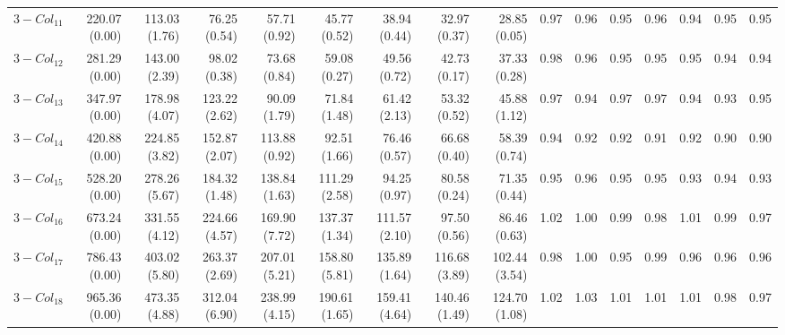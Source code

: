 \documentclass[preprint]{tlp}
\begin{document}
\begin{landscape}
\begin{tabular}{@{\extracolsep{\fill}}|c|r|r|r|r|r|r|r|r||r|r|r|r|r|r|r|}
$3-Col_{11}$ & 220.07 (0.00) &  113.03 (1.76) &  76.25 (0.54) &  57.71 (0.92) &  45.77 (0.52) &  38.94 (0.44) &  32.97 (0.37) &  28.85 (0.05) & 0.97 & 0.96 & 0.95 & 0.96 & 0.94 & 0.95 & 0.95 \\
$3-Col_{12}$ & 281.29 (0.00) &  143.00 (2.39) &  98.02 (0.38) &  73.68 (0.84) &  59.08 (0.27) &  49.56 (0.72) &  42.73 (0.17) &  37.33 (0.28) & 0.98 & 0.96 & 0.95 & 0.95 & 0.95 & 0.94 & 0.94 \\
$3-Col_{13}$ & 347.97 (0.00) &  178.98 (4.07) &  123.22 (2.62) &  90.09 (1.79) &  71.84 (1.48) &  61.42 (2.13) &  53.32 (0.52) &  45.88 (1.12) & 0.97 & 0.94 & 0.97 & 0.97 & 0.94 & 0.93 & 0.95 \\
$3-Col_{14}$ & 420.88 (0.00) &  224.85 (3.82) &  152.87 (2.07) &  113.88 (0.92) &  92.51 (1.66) &  76.46 (0.57) &  66.68 (0.40) &  58.39 (0.74) & 0.94 & 0.92 & 0.92 & 0.91 & 0.92 & 0.90 & 0.90 \\
$3-Col_{15}$ & 528.20 (0.00) &  278.26 (5.67) &  184.32 (1.48) &  138.84 (1.63) &  111.29 (2.58) &  94.25 (0.97) &  80.58 (0.24) &  71.35 (0.44) & 0.95 & 0.96 & 0.95 & 0.95 & 0.93 & 0.94 & 0.93 \\
$3-Col_{16}$ & 673.24 (0.00) &  331.55 (4.12) &  224.66 (4.57) &  169.90 (7.72) &  137.37 (1.34) &  111.57 (2.10) &  97.50 (0.56) &  86.46 (0.63) & 1.02 & 1.00 & 0.99 & 0.98 & 1.01 & 0.99 & 0.97 \\
$3-Col_{17}$ & 786.43 (0.00) &  403.02 (5.80) &  263.37 (2.69) &  207.01 (5.21) &  158.80 (5.81) &  135.89 (1.64) &  116.68 (3.89) &  102.44 (3.54) & 0.98 & 1.00 & 0.95 & 0.99 & 0.96 & 0.96 & 0.96 \\
$3-Col_{18}$ & 965.36 (0.00) &  473.35 (4.88) &  312.04 (6.90) &  238.99 (4.15) &  190.61 (1.65) &  159.41 (4.64) &  140.46 (1.49) &  124.70 (1.08) & 1.02 & 1.03 & 1.01 & 1.01 & 1.01 & 0.98 & 0.97 \\


\end{tabular}
\end{landscape}
\end{document}
